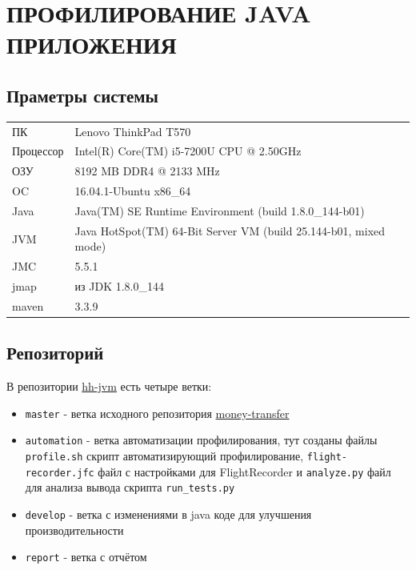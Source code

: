 \documentclass{article}
\begin{document}
	\section*{ПРОФИЛИРОВАНИЕ JAVA ПРИЛОЖЕНИЯ}
	\subsection*{Праметры системы}
	\begin{tabular}{ll}
		ПК            & Lenovo ThinkPad T570                      \\
		Процессор     & Intel(R) Core(TM) i5-7200U CPU @ 2.50GHz  \\
		ОЗУ           & 8192 MB DDR4 @ 2133 MHz                   \\
		OC            & 16.04.1-Ubuntu x86\_64                     \\
		Java          & Java(TM) SE Runtime Environment (build 1.8.0\_144-b01) \\
		JVM           & Java HotSpot(TM) 64-Bit Server VM (build 25.144-b01, mixed mode) \\
		JMC           & 5.5.1                                     \\
		jmap          & из JDK 1.8.0\_144                          \\
		maven          & 3.3.9                                     \\
	\end{tabular}

	\subsection*{Репозиторий}
		В репозитории  \href{https://github.com/eremeykin/hh-jvm/}{hh-jvm} есть четыре ветки:
		\begin{itemize}
			 \item \texttt{master} - ветка исходного репозитория \href{https://github.com/yarkinsv/money-transfer}{money-transfer}
			 \item \texttt{automation} - ветка автоматизации профилирования, тут созданы файлы \texttt{profile.sh} скрипт автоматизирующий профилирование,
			  \texttt{flight-recorder.jfc} файл с настройками для FlightRecorder и \texttt{analyze.py} файл для анализа вывода скрипта \texttt{run\_tests.py}
			 \item \texttt{develop} - ветка с изменениями в java коде для улучшения производительности
			 \item \texttt{report} - ветка с отчётом			 
		\end{itemize}
\end{document}
